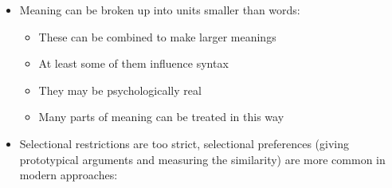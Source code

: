 \documentclass[headrule,footrule]{foils}
\begin{document}

\begin{itemize}
\item Meaning can be broken up into units smaller than words:   
  \begin{itemize}
  \item These can be combined to make larger meanings
  \item At least some of them influence syntax
  \item They may be psychologically real
  \item Many parts of meaning can be treated in this way
  \end{itemize}
\item {} Selectional restrictions are too strict,
  selectional preferences (giving prototypical arguments and measuring
  the similarity) are more common in modern approaches: 
\\ 
\end{itemize}


  
\end{document}
